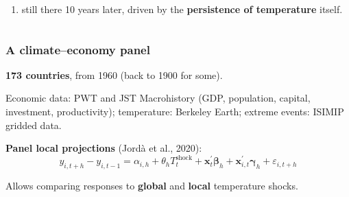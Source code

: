 \documentclass[xcolor=x11names,compress,aspectratio=169]{beamer}%
\makeatletter
\newenvironment{stepenumeratewithalert}{\begin{enumerate}[<+-| alert@+>]}{\end{enumerate}}
\newenvironment{stepitemizewithalert}{\begin{itemize}[<+-| alert@+>]}{\end{itemize} }
\renewenvironment{itemize}{\begin{compactitemize}[<+-| alert@+>]}{\end{compactitemize}}
\renewenvironment{stepitemizewithalert}{\begin{compactitemize}[<+-| alert@+>]}{\end{compactitemize}}
\renewenvironment{stepitemizewithalert}{\begin{itemize}}{\end{itemize}}
\renewenvironment{stepenumeratewithalert}{\begin{enumerate}}{\end{enumerate}}
\makeatother
\begin{document}
\begin{frame}
\begin{columns}
\begin{stepitemizewithalert}
\begin{stepenumeratewithalert}
\item still there 10 years later, driven by the \textbf{persistence of
temperature} itself.
\end{stepenumeratewithalert}
\end{stepitemizewithalert}
\end{columns}%

%

\transboxout
\end{frame}%
%

\begin{frame}%
%

\frametitle{A climate--economy panel}%


\begin{stepitemizewithalert}
\item \textbf{173 countries}, from 1960 (back to 1900 for some).%
\vspace{1ex}%


\item Economic data: PWT and JST Macrohistory (GDP, population, capital,
investment, productivity); temperature: Berkeley Earth; extreme events:
ISIMIP gridded data.%
\vspace{1ex}%


\item \textbf{Panel local projections} (Jord\`{a} et al., 2020):%
\[
y_{i,t+h}-y_{i,t-1}=\alpha_{i,h}+\theta_{h}T_{t}^{\text{shock}}+\mathbf{x}_{t}^{\prime}\boldsymbol{\beta}_{h}+\mathbf{x}_{i,t}^{\prime}\boldsymbol{\gamma}_{h}+\varepsilon_{i,t+h}
\]%
\vspace{1ex}%


\item Allows comparing responses to \textbf{global} and \textbf{local}
temperature shocks.
\end{stepitemizewithalert}

%

\transboxout
\end{frame}%
%
\end{document}
